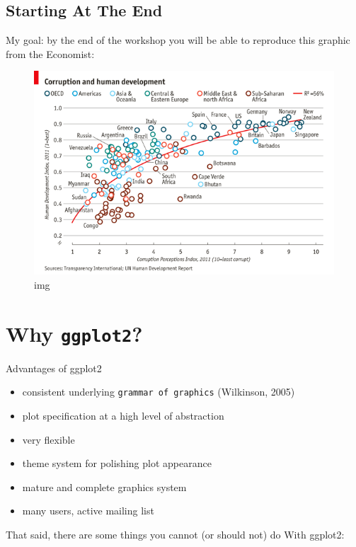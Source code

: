 \documentclass[]{book}
\providecommand{\tightlist}{%
  \setlength{\itemsep}{0pt}\setlength{\parskip}{0pt}}
\begin{document}
\subsection{Starting At The End}\label{starting-at-the-end}

My goal: by the end of the workshop you will be able to reproduce this
graphic from the Economist:

\begin{figure}
\centering
\includegraphics{R/Rgraphics/images/Economist1.png}
\caption{img}
\end{figure}

\section{\texorpdfstring{Why
\texttt{ggplot2}?}{Why ggplot2?}}\label{why-ggplot2}

Advantages of ggplot2

\begin{itemize}
\tightlist
\item
  consistent underlying \texttt{grammar\ of\ graphics} (Wilkinson, 2005)
\item
  plot specification at a high level of abstraction
\item
  very flexible
\item
  theme system for polishing plot appearance
\item
  mature and complete graphics system
\item
  many users, active mailing list
\end{itemize}

That said, there are some things you cannot (or should not) do With
ggplot2:
\end{document}
